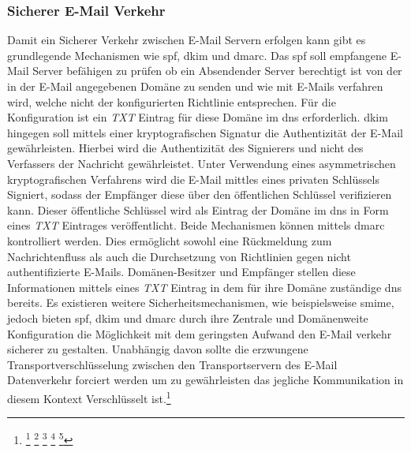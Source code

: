 \documentclass[11pt,a4paper,hidelinks]{article}   %
\begin{document}
            \subsubsection{Sicherer E-Mail Verkehr}
            Damit ein Sicherer Verkehr zwischen E-Mail Servern erfolgen kann gibt es grundlegende Mechanismen wie \gls{spf}, \gls{dkim} und \gls{dmarc}. Das \gls{spf} soll empfangene E-Mail Server befähigen zu prüfen ob ein Absendender Server berechtigt ist von der in der E-Mail angegebenen Domäne zu senden und wie mit E-Mails verfahren wird, welche nicht der konfigurierten Richtlinie entsprechen. Für die Konfiguration ist ein \emph{TXT} Eintrag für diese Domäne im \gls{dns} erforderlich. \gls{dkim} hingegen soll mittels einer kryptografischen Signatur die Authentizität der E-Mail gewährleisten. Hierbei wird die Authentizität des Signierers und nicht des Verfassers der Nachricht gewährleistet. Unter Verwendung eines asymmetrischen kryptografischen Verfahrens wird die E-Mail mittles eines privaten Schlüssels Signiert, sodass der Empfänger diese über den öffentlichen Schlüssel verifizieren kann. Dieser öffentliche Schlüssel wird als Eintrag der Domäne im \gls{dns} in Form eines \emph{TXT} Eintrages veröffentlicht. Beide Mechanismen können mittels \gls{dmarc} kontrolliert werden. Dies ermöglicht sowohl eine Rückmeldung zum Nachrichtenfluss als auch die Durchsetzung von Richtlinien gegen nicht authentifizierte E-Mails. Domänen-Besitzer und Empfänger stellen diese Informationen mittels eines \emph{TXT} Eintrag in dem für ihre Domäne zuständige \gls{dns} bereits. Es existieren weitere Sicherheitsmechanismen, wie beispielsweise \gls{smime}, jedoch bieten \gls{spf}, \gls{dkim} und \gls{dmarc} durch ihre Zentrale und Domänenweite Konfiguration die Möglichkeit mit dem geringsten Aufwand den E-Mail verkehr sicherer zu gestalten. Unabhängig davon sollte die erzwungene Transportverschlüsselung zwischen den Transportservern des E-Mail Datenverkehr forciert werden um zu gewährleisten das jegliche Kommunikation in diesem Kontext Verschlüsselt ist.\footnote{
                \footcite[Vgl.][, S. 5 \& 11 - 12]{RFC7208}
                \footcite[Vgl.][, S. 4]{RFC6376}
                \footcite[Vgl.][, S. 12 \& 15]{RFC5585}
                \footcite[Vgl.][, S. 5]{RFC8551}
                \footcite[Vgl.][, S. 4]{RFC8689}
            }
\end{document}
